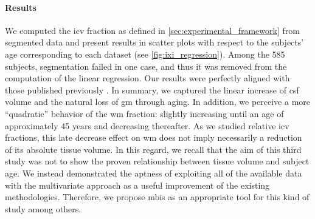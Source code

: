 \paragraph{Results}
We computed the \gls*{icv} fraction as defined in \autoref{sec:experimental_framework} from
  segmented data and present results in scatter plots with respect to the subjects' age
  corresponding to each dataset (see \autoref{fig:ixi_regression}).
Among the 585 subjects, segmentation failed in one case, and thus it was removed from the
  computation of the linear regression.
Our results were perfectly aligned with those published previously \citep{taki_correlations_2011,
  abe_sex_2010,mortamet_effects_2005,good_voxel-based_2001,ge_age-related_2002}.
In summary, we captured the linear increase of \gls*{csf} volume and the natural loss of \gls*{gm}
  through aging.
In addition, we perceive a more ``quadratic'' behavior of the \gls*{wm} fraction:
  slightly increasing until an age of approximately 45 years and decreasing thereafter.
As we studied relative \gls*{icv} fractions, this late decrease effect on \gls*{wm} does 
  not imply necessarily a reduction of its absolute tissue volume.
In this regard, we recall that the aim of this third study was not to show the proven 
  relationship between tissue volume and subject age.
We instead demonstrated the aptness of exploiting all of the available data with
  the multivariate approach as a useful improvement of the existing methodologies.
Therefore, we propose \gls*{mbis} as an appropriate tool for this kind of study among others.
